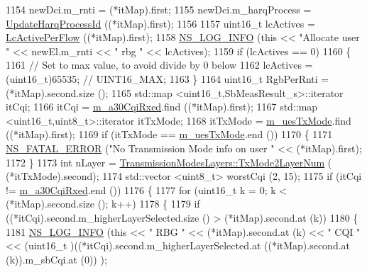 \begin{DoxyCode}
1154       newDci.m\_rnti = (*itMap).first;
1155       newDci.m\_harqProcess = \hyperlink{classns3_1_1TtaFfMacScheduler_aa2c9ed548b16ace6abe0f0de7501f1df}{UpdateHarqProcessId} ((*itMap).first);
1156 
1157       uint16\_t lcActives = \hyperlink{classns3_1_1TtaFfMacScheduler_a2907ecc4ef7185be679248f833fc931b}{LcActivePerFlow} ((*itMap).first);
1158       \hyperlink{group__logging_gafbd73ee2cf9f26b319f49086d8e860fb}{NS\_LOG\_INFO} (\textcolor{keyword}{this} << \textcolor{stringliteral}{"Allocate user "} << newEl.m\_rnti << \textcolor{stringliteral}{" rbg "} << lcActives);
1159       \textcolor{keywordflow}{if} (lcActives == 0)
1160         \{
1161           \textcolor{comment}{// Set to max value, to avoid divide by 0 below}
1162           lcActives = (uint16\_t)65535; \textcolor{comment}{// UINT16\_MAX;}
1163         \}
1164       uint16\_t RgbPerRnti = (*itMap).second.size ();
1165       std::map <uint16\_t,SbMeasResult\_s>::iterator itCqi;
1166       itCqi = \hyperlink{classns3_1_1TtaFfMacScheduler_aeb3f62c230eed9a1e5488b7466c26d56}{m\_a30CqiRxed}.find ((*itMap).first);
1167       std::map <uint16\_t,uint8\_t>::iterator itTxMode;
1168       itTxMode = \hyperlink{classns3_1_1TtaFfMacScheduler_af212e1d69d8cbe7785eaea3fb3161953}{m\_uesTxMode}.find ((*itMap).first);
1169       \textcolor{keywordflow}{if} (itTxMode == \hyperlink{classns3_1_1TtaFfMacScheduler_af212e1d69d8cbe7785eaea3fb3161953}{m\_uesTxMode}.end ())
1170         \{
1171           \hyperlink{group__fatal_ga5131d5e3f75d7d4cbfd706ac456fdc85}{NS\_FATAL\_ERROR} (\textcolor{stringliteral}{"No Transmission Mode info on user "} << (*itMap).first);
1172         \}
1173       \textcolor{keywordtype}{int} nLayer = \hyperlink{classns3_1_1TransmissionModesLayers_a31f608b7bfaa77440fe4cb85ad035329}{TransmissionModesLayers::TxMode2LayerNum} (
      (*itTxMode).second);
1174       std::vector <uint8\_t> worstCqi (2, 15);
1175       \textcolor{keywordflow}{if} (itCqi != \hyperlink{classns3_1_1TtaFfMacScheduler_aeb3f62c230eed9a1e5488b7466c26d56}{m\_a30CqiRxed}.end ())
1176         \{
1177           \textcolor{keywordflow}{for} (uint16\_t k = 0; k < (*itMap).second.size (); k++)
1178             \{
1179               \textcolor{keywordflow}{if} ((*itCqi).second.m\_higherLayerSelected.size () > (*itMap).second.at (k))
1180                 \{
1181                   \hyperlink{group__logging_gafbd73ee2cf9f26b319f49086d8e860fb}{NS\_LOG\_INFO} (\textcolor{keyword}{this} << \textcolor{stringliteral}{" RBG "} << (*itMap).second.at (k) << \textcolor{stringliteral}{" CQI "} << (uint16\_t
      )((*itCqi).second.m\_higherLayerSelected.at ((*itMap).second.at (k)).m\_sbCqi.at (0)) );

\end{DoxyCode}
